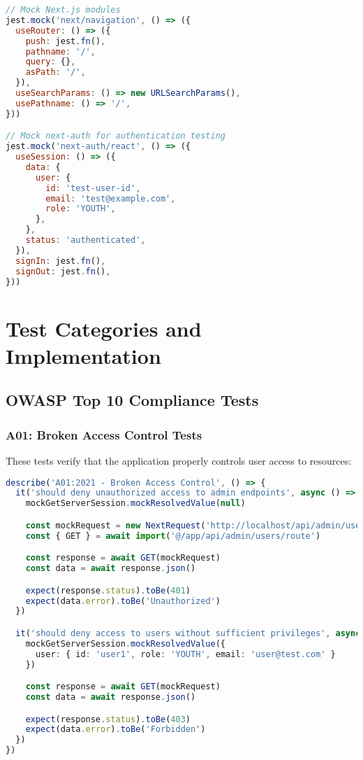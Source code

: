 \documentclass[12pt]{article}
\begin{document}
\begin{lstlisting}[language=javascript, caption=jest.setup.js Highlights]
// Mock Next.js modules
jest.mock('next/navigation', () => ({
  useRouter: () => ({
    push: jest.fn(),
    pathname: '/',
    query: {},
    asPath: '/',
  }),
  useSearchParams: () => new URLSearchParams(),
  usePathname: () => '/',
}))

// Mock next-auth for authentication testing
jest.mock('next-auth/react', () => ({
  useSession: () => ({
    data: {
      user: {
        id: 'test-user-id',
        email: 'test@example.com',
        role: 'YOUTH',
      },
    },
    status: 'authenticated',
  }),
  signIn: jest.fn(),
  signOut: jest.fn(),
}))
\end{lstlisting}

\section{Test Categories and Implementation}

\subsection{OWASP Top 10 Compliance Tests}

\subsubsection{A01: Broken Access Control Tests}
These tests verify that the application properly controls user access to resources:

\begin{lstlisting}[language=typescript, caption=Access Control Test Example]
describe('A01:2021 - Broken Access Control', () => {
  it('should deny unauthorized access to admin endpoints', async () => {
    mockGetServerSession.mockResolvedValue(null)

    const mockRequest = new NextRequest('http://localhost/api/admin/users')
    const { GET } = await import('@/app/api/admin/users/route')

    const response = await GET(mockRequest)
    const data = await response.json()

    expect(response.status).toBe(401)
    expect(data.error).toBe('Unauthorized')
  })

  it('should deny access to users without sufficient privileges', async () => {
    mockGetServerSession.mockResolvedValue({
      user: { id: 'user1', role: 'YOUTH', email: 'user@test.com' }
    })

    const response = await GET(mockRequest)
    const data = await response.json()

    expect(response.status).toBe(403)
    expect(data.error).toBe('Forbidden')
  })
})
\end{lstlisting}
\end{document}

